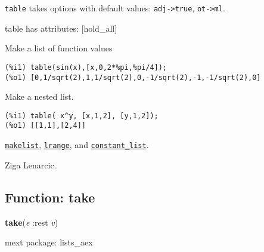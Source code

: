 \documentclass[]{article}
\begin{document}
\vspace{5 pt}

{\tt table} takes options with default values: {\tt adj->true}, {\tt ot->ml}.
\vspace{5 pt}

table has attributes: [hold\_all]

\vspace{5 pt}


   Make a list of function values 

\begin{Verbatim}[frame=single]
(%i1) table(sin(x),[x,0,2*%pi,%pi/4]);
(%o1) [0,1/sqrt(2),1,1/sqrt(2),0,-1/sqrt(2),-1,-1/sqrt(2),0]
\end{Verbatim}

   Make a nested list. 

\begin{Verbatim}[frame=single]
(%i1) table( x^y, [x,1,2], [y,1,2]);
(%o1) [[1,1],[2,4]]
\end{Verbatim}


  \hyperlink{makelist}{{\tt makelist}}, \hyperlink{lrange}{{\tt lrange}}, and \hyperlink{constant_list}{{\tt constant\_list}}.

\vspace{5 pt}


Ziga Lenarcic.

\vspace{5 pt}


\subsection{Function: take\label{sec:take}}
\hypertarget{take}{}
{\bf take}({\it e} :rest {\it v})


\noindent mext package: lists\_aex
\end{document}
